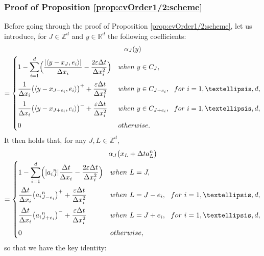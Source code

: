 \documentclass[11pt]{article}
\numberwithin{equation}{section}
\def\RR{\mathbb{R}}
\def\ZZ{\mathbb{Z}}
\let\ds\displaystyle
\def\eps{\varepsilon}
\def\dt{\Delta t}
\def\dx{\Delta x}
\theoremstyle{plain}
\theoremstyle{definition}
\begin{document}
\subsubsection{Proof of Proposition \ref{prop:cvOrder1/2:scheme}}

Before going through the proof of Proposition \ref{prop:cvOrder1/2:scheme}, let us introduce, for $J\in\ZZ^d$ and $y \in \RR^d$ the following coefficients:
\begin{multline}\label{def:alpha}
\alpha_J(y)\\
=
\begin{cases}
\ds 1-\sum_{i=1}^d \Bigl(\frac{|\langle y-{x_J},e_i\rangle|}{\dx_i} - \frac{2\eps\dt}{\dx_i^2}\Bigr)
& \textup{when} \ y\in C_J,
\vspace{5pt}
\\
\ds \frac{1}{\dx_i}\bigl(\langle y-x_{J-e_i},e_i\rangle\bigr)^+ + \frac{\eps\dt}{\dx_i^2}
&\textup{when} \ y\in C_{J-e_i}, \ \ \textup{for} \ i= 1,\dots,d,
\vspace{5pt}
\\
\ds \frac{1}{\dx_i}\bigl(\langle y-x_{J+e_i},e_i\rangle\bigr)^- + \frac{\eps\dt}{\dx_i^2}
&\textup{when} \ y\in C_{J+e_i}, \ \ \textup{for} \ i=1,\dots,d,
\vspace{5pt}
\\
0 &\textup{otherwise}.
\end{cases}
\end{multline}
It then holds that, for any $J,L \in {\mathbb Z}^d$,
\begin{multline*}%
\alpha_{J} \bigl( x_{L} + \dt a^n_{L}\bigr)\\ =
\begin{cases}
\ds 1-\sum_{i=1}^d \Bigl(\vert {a_{i}}^n_{J} \vert \frac{\dt}{\dx_i} - \frac{2\eps\dt}{\dx_i^2}\Bigr)
&\textup{ when } \ L=J,
\vspace{5pt}
\\
\ds \frac{\dt}{\dx_i}\bigl( {a_{i}}^n_{J-e_{i}} \bigr)^{+} + \frac{\eps\dt}{\dx_i^2}
&\textup{ when } \ L = J-e_{i}, \ \ \textup{for} \ i= 1,\dots,d,
\vspace{5pt}
\\
\ds \frac{\dt}{\dx_i}\bigl( {a_{i}}^n_{J+e_{i}} \bigr)^{-} + \frac{\eps\dt}{\dx_i^2}
&\textup{ when } \ L = J+e_{i}, \ \ \textup{for} \ i= 1,\dots,d,
\vspace{5pt}
\\
0 & \textup{ otherwise},
\end{cases}
\end{multline*}
so that we have the key identity:
\end{document}
